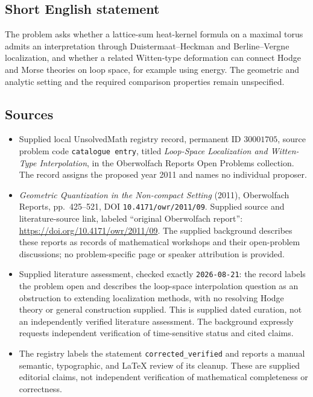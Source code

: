 \documentclass[11pt]{article}
\begin{document}
\subsection{Short English statement}
The problem asks whether a lattice-sum heat-kernel formula on a maximal torus admits an interpretation through Duistermaat--Heckman and Berline--Vergne localization, and whether a related Witten-type deformation can connect Hodge and Morse theories on loop space, for example using energy. The geometric and analytic setting and the required comparison properties remain unspecified.
\subsection{Sources}
\begin{itemize}
\item Supplied local UnsolvedMath registry record, permanent ID \(30001705\), source problem code \texttt{catalogue entry}, titled \emph{Loop-Space Localization and Witten-Type Interpolation}, in the Oberwolfach Reports Open Problems collection. The record assigns the proposed year 2011 and names no individual proposer.
\item \emph{Geometric Quantization in the Non-compact Setting} (2011), Oberwolfach Reports, pp.\ 425--521, DOI \texttt{10.4171/owr/2011/09}. Supplied source and literature-source link, labeled ``original Oberwolfach report'': \url{https://doi.org/10.4171/owr/2011/09}. The supplied background describes these reports as records of mathematical workshops and their open-problem discussions; no problem-specific page or speaker attribution is provided.
\item Supplied literature assessment, checked exactly \texttt{2026-08-21}: the record labels the problem open and describes the loop-space interpolation question as an obstruction to extending localization methods, with no resolving Hodge theory or general construction supplied. This is supplied dated curation, not an independently verified literature assessment. The background expressly requests independent verification of time-sensitive status and cited claims.
\item The registry labels the statement \texttt{corrected\_verified} and reports a manual semantic, typographic, and LaTeX review of its cleanup. These are supplied editorial claims, not independent verification of mathematical completeness or correctness.
\end{itemize}
\end{document}
